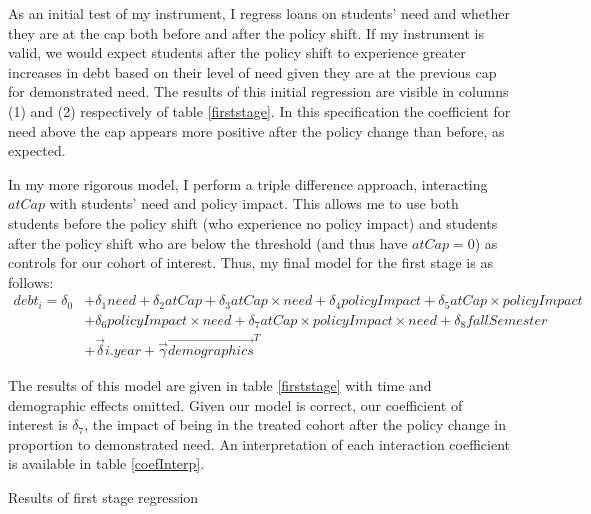 \documentclass{article}
\newcommand{\regs}{../Analysis/Regressions/Output/}
\begin{document}
	As an initial test of my instrument, I regress loans on students' need and whether they are at the cap both before and after the policy shift. If my instrument is valid, we would expect students after the policy shift to experience greater increases in debt based on their level of need given they are at the previous cap for demonstrated need. The results of this initial regression are visible in columns (1) and (2) respectively of table \ref{firststage}. In this specification the coefficient for need above the cap appears more positive after the policy change than before, as expected. 
	
	In my more rigorous model, I perform a triple difference approach, interacting $atCap$ with students' need and policy impact. This allows me to use both students before the policy shift (who experience no policy impact) and students after the policy shift who are below the threshold (and thus have $atCap = 0$) as controls for our cohort of interest. Thus, my final model for the first stage is as follows: 
	\begin{align*}
	debt_i = \delta_0 &+ \delta_1 need + \delta_2 atCap + \delta_3 atCap \times need + \delta_4 policyImpact + \delta_5 atCap \times policyImpact\\
	 &+ \delta_6 policyImpact \times need + \delta_7 atCap \times policyImpact \times need + \delta_8 fallSemester \\
	 &+ \vec{\delta} i.year + \vec{\gamma} \vec{demographics}^T
	 \end{align*} 
	 
	 The results of this model are given in table \ref{firststage} with time and demographic effects omitted. Given our model is correct, our coefficient of interest is $\delta_7$, the impact of being in the treated cohort after the policy change in proportion to demonstrated need. An interpretation of each interaction coefficient is available in table \ref{coefInterp}.
	 
	 \begin{table}
	 	\centering
	 	\caption{Results of first stage regression}	 	
	 	
	 	\label{firststage}
	 \end{table}
	
\end{document}
